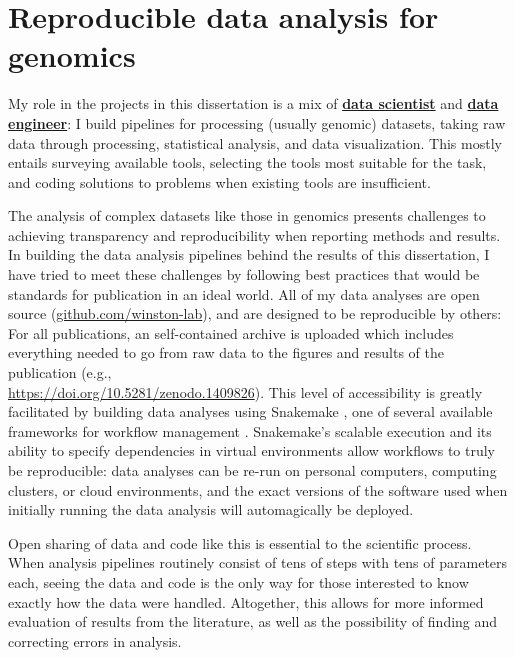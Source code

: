 \section{Reproducible data analysis for genomics}

My role in the projects in this dissertation is a mix of \href{https://blog.insightdatascience.com/data-science-vs-data-engineering-62da7678adaa}{\textbf{data scientist}} and \href{https://blog.insightdatascience.com/data-science-vs-data-engineering-62da7678adaa}{\textbf{data engineer}}: I build pipelines for processing (usually genomic) datasets, taking raw data through processing, statistical analysis, and data visualization.
This mostly entails surveying available tools, selecting the tools most suitable for the task, and coding solutions to problems when existing tools are insufficient.

The analysis of complex datasets like those in genomics presents challenges to achieving transparency and reproducibility when reporting methods and results.
In building the data analysis pipelines behind the results of this dissertation, I have tried to meet these challenges by following best practices that would be standards for publication in an ideal world.
All of my data analyses are open source (\href{https://github.com/winston-lab}{github.com/winston-lab}), and are designed to be reproducible by others: For all publications, an self-contained archive is uploaded which includes everything needed to go from raw data to the figures and results of the publication (e.g.,\\\url{https://doi.org/10.5281/zenodo.1409826}).
This level of accessibility is greatly facilitated by building data analyses using Snakemake \citep{koster2012}, one of several available frameworks for workflow management \citep{voss2017, ditommaso2017}.
Snakemake's scalable execution and its ability to specify dependencies in virtual environments allow workflows to truly be reproducible: data analyses can be re-run on personal computers, computing clusters, or cloud environments, and the exact versions of the software used when initially running the data analysis will automagically be deployed.

Open sharing of data and code like this is essential to the scientific process.
When analysis pipelines routinely consist of tens of steps with tens of parameters each, seeing the data and code is the only way for those interested to know exactly how the data were handled.
Altogether, this allows for more informed evaluation of results from the literature, as well as the possibility of finding and correcting errors in analysis.

\clearpage

\begingroup
    \singlespacing
    
\endgroup


